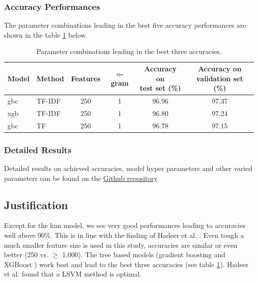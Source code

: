 \documentclass[a4paper,12pt,nottoc]{article}
\begin{document}
\subsubsection{Accuracy Performances}

The parameter combinations leading in the best five accuracy performances are shown in the table \ref{tab:accperf} below.

\begin{table}[h]
\begin{center}
\begin{tabular}{| l | l | c | c | c | c |}
\hline
Model & Method & Features & $n$-gram & \thead{Accuracy on \\ test set (\%)} & \thead{Accuracy on \\ validation set (\%)} \\
\hline
gbc & TF-IDF & 250 & 1 & 96.96 & 97.37 \\
xgb & TF-IDF & 250 & 1 & 96.80 & 97.24 \\
gbc & TF & 250 & 1 & 96.78 & 97.15	 \\
\hline 
\end{tabular}
\end{center}
\caption{Parameter combinations leading in the best three accuracies.}\label{tab:accperf}
\end{table}

\clearpage
\subsubsection{Detailed Results}

Detailed results on achieved accuracies, model hyper parameters and other varied parameters can be found on the \href{https://github.com/benjaminperucco/udacity-nano-mle/blob/master/5%20Capstone/2%20Project/3_postprocessing.ipynb}{Github repository}. 

\subsection{Justification}

Except for the knn model, we see very good performances leading to accuracies well above 90\%. This is in line with the finding of Hadeer et al. \cite{bib:ahmed-2017}. Even tough a much smaller feature size is used in this study, accuracies are similar or even better (250 vs. $\geq$ 1,000). The tree based models (gradient boosting \cite{bib:gbc} and XGBoost \cite{bib:xgb}) work best and lead to the best three accuracies (see table \ref{tab:accperf}). Hadeer et al. \cite{bib:ahmed-2017} found that a LSVM method is optimal.\\
\end{document}
